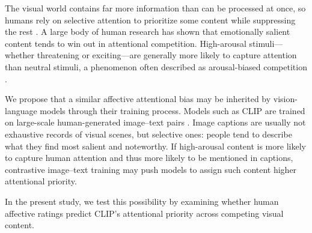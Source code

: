 \documentclass{article}
\begin{document}
The visual world contains far more information than can be processed at once, so humans rely on selective attention to prioritize some content while suppressing the rest \citep{tresilianSelectiveAttentionReaching1999,serencesSelectiveVisualAttention2006,desimoneNeuralMechanismsSelective1995}. A large body of human research has shown that emotionally salient content tends to win out in attentional competition. High-arousal stimuli---whether threatening or exciting---are generally more likely to capture attention than neutral stimuli, a phenomenon often described as arousal-biased competition \citep{hansenFindingFaceCrowd1988a,ohmanEmotionDrivesAttention2001,vogtAllocationSpatialAttention2008b,schimmackAttentionalInterferenceEffects2005a}.

We propose that a similar affective attentional bias may be inherited by vision-language models through their training process. Models such as CLIP are trained on large-scale human-generated image--text pairs \citep{radfordLearningTransferableVisual2021a}. Image captions are usually not exhaustive records of visual scenes, but selective ones: people tend to describe what they find most salient and noteworthy. If high-arousal content is more likely to capture human attention and thus more likely to be mentioned in captions, contrastive image--text training may push models to assign such content higher attentional priority. 

In the present study, we test this possibility by examining whether human affective ratings predict CLIP’s attentional priority across competing visual content.


\end{document}
